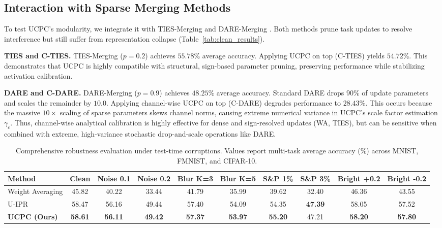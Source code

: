 \documentclass{article}
\theoremstyle{plain}
\theoremstyle{definition}
\theoremstyle{remark}
\begin{document}
\subsection{Interaction with Sparse Merging Methods}
To test UCPC's modularity, we integrate it with TIES-Merging \cite{yadav23} and DARE-Merging \cite{yu24}. Both methods prune task updates to resolve interference but still suffer from representation collapse (Table~\ref{tab:clean_results}).

\textbf{TIES and C-TIES.} TIES-Merging ($p=0.2$) achieves $55.78\%$ average accuracy. Applying UCPC on top (C-TIES) yields $54.72\%$. This demonstrates that UCPC is highly compatible with structural, sign-based parameter pruning, preserving performance while stabilizing activation calibration.

\textbf{DARE and C-DARE.} DARE-Merging ($p=0.9$) achieves $48.25\%$ average accuracy. Standard DARE drops $90\%$ of update parameters and scales the remainder by $10.0$. Applying channel-wise UCPC on top (C-DARE) degrades performance to $28.43\%$. This occurs because the massive $10\times$ scaling of sparse parameters skews channel norms, causing extreme numerical variance in UCPC's scale factor estimation $\gamma_c$. Thus, channel-wise analytical calibration is highly effective for dense and sign-resolved updates (WA, TIES), but can be sensitive when combined with extreme, high-variance stochastic drop-and-scale operations like DARE.

\begin{table}[t]
  \caption{Comprehensive robustness evaluation under test-time corruptions. Values report multi-task average accuracy (\%) across MNIST, FMNIST, and CIFAR-10.}
  \label{tab:robustness_mega}
  \vskip 0.03in
  \centering
  \begin{small}
    \begin{sc}
      \setlength{\tabcolsep}{2.5pt}
      \begin{tabular}{lccccccccc}
        \toprule
        Method & Clean & Noise 0.1 & Noise 0.2 & Blur K=3 & Blur K=5 & S\&P 1\% & S\&P 3\% & Bright +0.2 & Bright -0.2 \\
        \midrule
        Weight Averaging & 45.82 & 40.22 & 33.44 & 41.79 & 35.99 & 39.62 & 32.40 & 46.36 & 43.55 \\
        U-IPR & 58.47 & 56.16 & 49.44 & 57.40 & 54.09 & 54.35 & \textbf{47.39} & 58.05 & 57.52 \\
        \textbf{UCPC (Ours)} & \textbf{58.61} & \textbf{56.11} & \textbf{49.42} & \textbf{57.37} & \textbf{53.97} & \textbf{55.20} & 47.21 & \textbf{58.20} & \textbf{57.80} \\
        \bottomrule
      \end{tabular}
    \end{sc}
  \end{small}
  \vskip -0.1in
\end{table}
\end{document}
